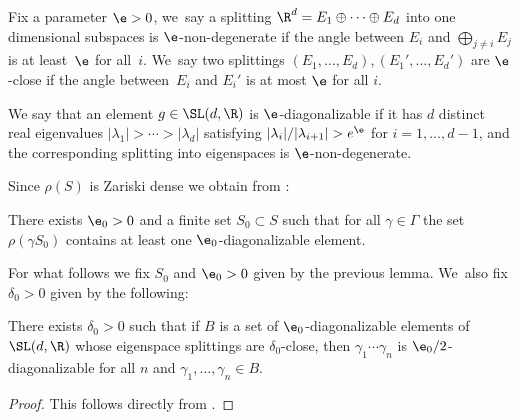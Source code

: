 Fix a parameter \(\e> 0 \), we~say a splitting \(\R^d = E_1 \oplus \cdots \oplus E_d\) into one dimensional subspaces is \(\e\)-non-degenerate if
the angle between \(E_i\) and \(\bigoplus_{j \neq i}E_j\) is at least~\(\e\) for all~\(i\). We~say two splittings \((E_1,\ldots, E_d), (E_1',\ldots,E_d')\) are \(\e\)-close if the angle between~\(E_i\) and \(E_i'\) is at most \(\e\) for all \(i\).

We say that an element \(g \in \SL(d,\R)\) is \(\e\)-diagonalizable if it has \(d\) distinct real eigenvalues \(|\lambda_1| > \cdots > |\lambda_d|\) satisfying \(|\lambda_i|/|\lambda_{i+1}| > e^{\e}\) for \(i = 1,\ldots, d-1\), and the corresponding splitting into eigenspaces is \(\e\)-non-degenerate.

Since \(\rho(S)\) is Zariski dense we obtain from \cite[Th.\,6.8]{AMS95}:
\begin{lemma}\label{abslemma}
There exists \(\e_0 > 0\) and a finite set \(S_0 \subset S\) such that for all \(\gamma \in \Gamma\) the set \(\rho(\gamma S_0)\) contains at least one \(\e_0\)-diagonalizable element.
\end{lemma}

For what follows we fix \(S_0\) and \(\e_0 > 0\) given by the previous lemma. We~also fix \(\delta_0 > 0\) given by the following:
\begin{lemma}
There exists \(\delta_0 > 0\) such that if \(B \) is a set of \(\e_0\)-diagonalizable elements of \(\SL(d,\R) \) whose eigenspace splittings are \(\delta_0\)-close, then
\(\gamma_1\cdots \gamma_n\) is \(\e_0/2\)-diagonalizable for all \(n\) and \(\gamma_1,\ldots, \gamma_n \in B\).
\end{lemma}
\begin{proof}
This follows directly from \cite[Lem.\,2.17]{2021breuillard-sert}.
\end{proof}

